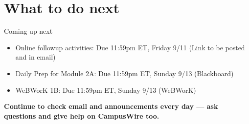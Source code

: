 \documentclass[10pt]{beamer}
\begin{document}
\section[What to do next]{What to do next}
\begin{frame}{Coming up next}
    \begin{itemize}
    \item Online followup activities: Due 11:59pm ET, Friday 9/11 (Link to be posted and in email) 
    \item Daily Prep for Module 2A: Due 11:59pm ET, Sunday 9/13 (Blackboard)
    \item WeBWorK 1B: Due 11:59pm ET, Sunday 9/13 (WeBWorK)
\end{itemize}

\textbf{Continue to check email and announcements every day --- ask questions and give help on CampusWire too.}

\vfill
\begin{center}\ccbysa\end{center}

\end{frame}
\end{document}
